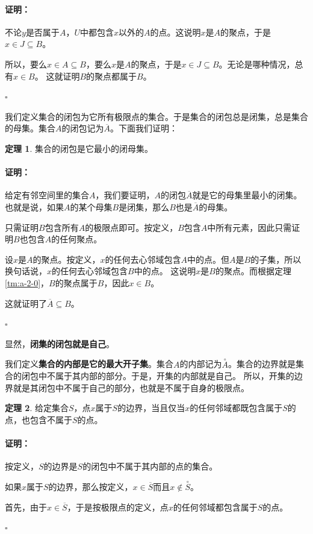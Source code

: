 \documentclass[12pt,UTF8]{ctexbook}
\theoremstyle{definition}
\newtheorem{tm}{定理}[section]
\theoremstyle{plain}
\renewenvironment{proof}{\paragraph{\textbf{证明：}}}{\hfill$\square$}
\begin{document}
\begin{appendix}
\begin{proof}
    不论$y$是否属于$A$，$U$中都包含$x$以外的$A$的点。这说明$x$是$A$的聚点，于是$x\in J\subseteq B$。
    
    所以，要么$x\in A\subseteq B$，要么$x$是$A$的聚点，于是$x\in J\subseteq B$。无论是哪种情况，总有$x\in B$。
    这就证明$B$的聚点都属于$B$。

\end{proof}

我们定义集合的闭包为它所有极限点的集合。于是集合的闭包总是闭集，总是集合的母集。集合$A$的闭包记为$\overline{A}$。下面我们证明：

\begin{tm}\label{tm:a-2-20}
    集合的闭包是它最小的闭母集。
\end{tm}

\begin{proof}
    给定有邻空间里的集合$A$，我们要证明，$A$的闭包$\overline{A}$就是它的母集里最小的闭集。
    也就是说，如果$A$的某个母集$B$是闭集，那么$B$也是$\overline{A}$的母集。

    只需证明$B$包含所有$A$的极限点即可。按定义，$B$包含$A$中所有元素，因此只需证明$B$也包含$A$的任何聚点。

    设$x$是$A$的聚点。按定义，$x$的任何去心邻域包含$A$中的点。但$A$是$B$的子集，所以换句话说，$x$的任何去心邻域包含$B$中的点。
    这说明$x$是$B$的聚点。而根据定理\ref{tm:a-2-0}，$B$的聚点属于$B$，因此$x\in B$。
    
    这就证明了$\overline{A}\subseteq B$。

\end{proof}

显然，\textbf{闭集的闭包就是自己}。

我们定义\textbf{集合的内部是它的最大开子集}。集合$A$的内部记为$\overset{\circ}{A}$。集合的边界就是集合的闭包中不属于其内部的部分。于是，开集的内部就是自己。
所以，开集的边界就是其闭包中不属于自己的部分，也就是不属于自身的极限点。

\begin{tm}\label{tm:a-2-30}
    给定集合$S$，点$x$属于$S$的边界，当且仅当$x$的任何邻域都既包含属于$S$的点，也包含不属于$S$的点。
\end{tm}

\begin{proof}
    按定义，$S$的边界是$S$的闭包中不属于其内部的点的集合。

    如果$x$属于$S$的边界，那么按定义，$x\in \overline{S}$而且$x\notin\overset{\circ}{S}$。

    首先，由于$x\in \overline{S}$，于是按极限点的定义，点$x$的任何邻域都包含属于$S$的点。


\end{proof}
\end{appendix}
\end{document}
